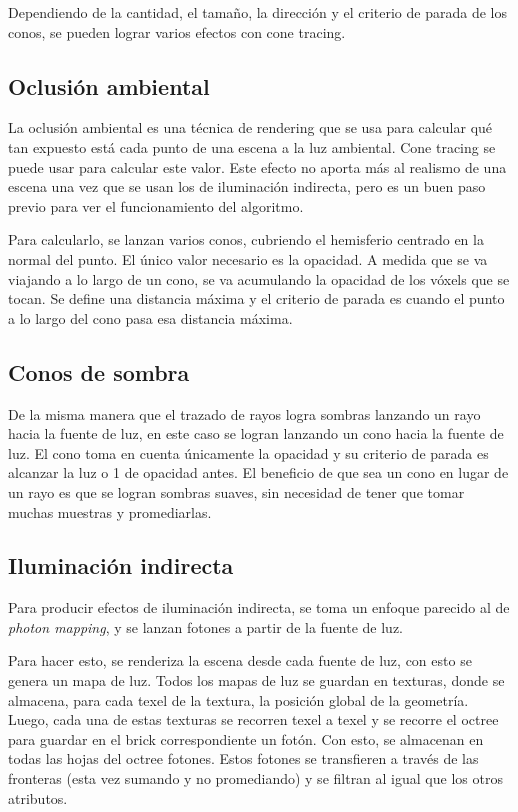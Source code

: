 Dependiendo de la cantidad, el tamaño, la dirección y el criterio de parada de los conos, se pueden lograr varios efectos con cone tracing.

\subsection{Oclusión ambiental}

La oclusión ambiental es una técnica de rendering que se usa para calcular qué tan expuesto está cada punto de una escena a la luz ambiental.
Cone tracing se puede usar para calcular este valor.
Este efecto no aporta más al realismo de una escena una vez que se usan los de iluminación indirecta, pero es un buen paso previo para ver el funcionamiento del algoritmo.

Para calcularlo, se lanzan varios conos, cubriendo el hemisferio centrado en la normal del punto.
El único valor necesario es la opacidad.
A medida que se va viajando a lo largo de un cono, se va acumulando la opacidad de los vóxels que se tocan.
Se define una distancia máxima y el criterio de parada es cuando el punto a lo largo del cono pasa esa distancia máxima.

\subsection{Conos de sombra}

De la misma manera que el trazado de rayos logra sombras lanzando un rayo hacia la fuente de luz, en este caso se logran lanzando un cono hacia la fuente de luz.
El cono toma en cuenta únicamente la opacidad y su criterio de parada es alcanzar la luz o 1 de opacidad antes.
El beneficio de que sea un cono en lugar de un rayo es que se logran sombras suaves, sin necesidad de tener que tomar muchas muestras y promediarlas.

\subsection{Iluminación indirecta}

Para producir efectos de iluminación indirecta, se toma un enfoque parecido al de \textit{photon mapping}, y se lanzan fotones a partir de la fuente de luz.

Para hacer esto, se renderiza la escena desde cada fuente de luz, con esto se genera un mapa de luz.
Todos los mapas de luz se guardan en texturas, donde se almacena, para cada texel de la textura, la posición global de la geometría.
Luego, cada una de estas texturas se recorren texel a texel y se recorre el octree para guardar en el brick correspondiente un fotón.
Con esto, se almacenan en todas las hojas del octree fotones.
Estos fotones se transfieren a través de las fronteras (esta vez sumando y no promediando) y se filtran al igual que los otros atributos.

